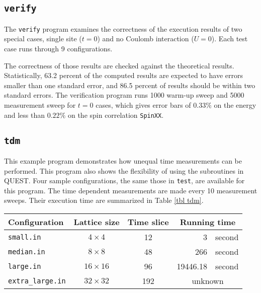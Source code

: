 \documentclass[12pt]{article}
\begin{document}
\subsection{\tt verify}
The \verb|verify| program examines the correctness of the execution results of two special cases, single site ($t=0$) and no Coulomb interaction ($U=0$).
Each test case runs through 9 configurations.
		
The correctness of those results are checked against the theoretical results. Statistically, 63.2 percent of the computed results are expected to have errors smaller than one standard error, and 86.5 percent of results should be within two standard errors. The verification program runs 1000 warm-up sweep and 5000 measurement sweep for $t=0$ cases, which gives error bars of $0.33\%$ on the energy and less than $0.22\%$ on the spin correlation \verb|SpinXX|.


\subsection{\tt tdm}
This example program demonstrates how unequal time measurements can be performed.  This program also shows the flexibility of using the subroutines in QUEST.  Four sample configurations, the same those in \verb|test|, are available for this program.
The time dependent measurements are made every 10 measurement sweeps.
Their execution time are summarized in Table \ref{tbl tdm}.

	\begin{center}
	\begin{tabular}{|l|c|c|rl|}
	\hline
	Configuration   &  Lattice size & Time slice& \multicolumn{2}{|c|}{Running time}\\
	\hline
	\verb|small.in|  & $4\times 4$ & 12 & 3 & second\\
	\verb|median.in|  & $8\times 8$ & 48 & 266 & second\\
	\verb|large.in|  & $16\times 16$ & 96 & 19446.18 & second\\
	\verb|extra_large.in|  & $32\times 32$ & 192 & \multicolumn{2}{|c|}{unknown}\\
	\hline	
	 \end{tabular}
	\end{center}
\end{document}
